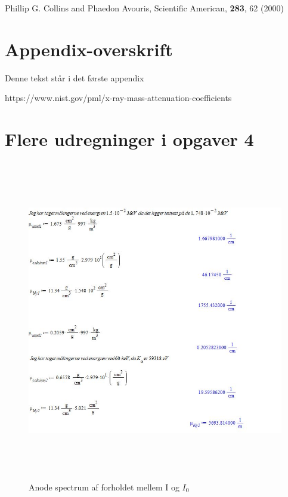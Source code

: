 \documentclass[a4paper,twoside]{article}
\begin{document}
\begin{thebibliography}{} %
Phillip G. Collins and Phaedon Avouris, Scientific American, \textbf{283}, 62 (2000)
\end{thebibliography}

\newpage 

\appendix
\section{Appendix-overskrift}
Denne tekst står i det første appendix

https://www.nist.gov/pml/x-ray-mass-attenuation-coefficients


\section{Flere udregninger i opgaver 4}
\begin{figure}[H]
\begin{centering}
\includegraphics[height=14cm]{Opgave 4.jpg}
\hspace{1cm}
\par\end{centering}
\caption{\label{cap:2ien} Anode spectrum af forholdet mellem I og $I_0$ }
\end{figure}
\end{document}
